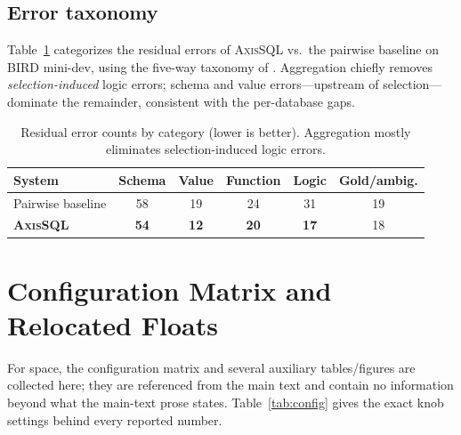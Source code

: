\documentclass{article}
\newcommand{\sys}{\textsc{AxisSQL}\xspace}
\begin{document}
\subsection{Error taxonomy}
\label{app:error}
Table~\ref{tab:s-error} categorizes the residual errors of \sys{} vs.\ the pairwise baseline on BIRD mini-dev, using the five-way taxonomy of \citet{li2026deepeye}. Aggregation chiefly removes \emph{selection-induced} logic errors; schema and value errors---upstream of selection---dominate the remainder, consistent with the per-database gaps.

\begin{table}[h]
\centering\small
\caption{Residual error counts by category (lower is better). Aggregation mostly eliminates selection-induced logic errors.}
\label{tab:s-error}
\begin{tabular}{@{}lccccc@{}}
\toprule
\textbf{System} & \textbf{Schema} & \textbf{Value} & \textbf{Function} & \textbf{Logic} & \textbf{Gold/ambig.} \\
\midrule
Pairwise baseline & 58 & 19 & 24 & 31 & 19 \\
\textbf{\sys}     & \textbf{54} & \textbf{12} & \textbf{20} & \textbf{17} & 18 \\
\bottomrule
\end{tabular}
\end{table}

\section{Configuration Matrix and Relocated Floats}
\label{app:floats}
For space, the configuration matrix and several auxiliary tables/figures are collected here; they are referenced from the main text and contain no information beyond what the main-text prose states. Table~\ref{tab:config} gives the exact knob settings behind every reported number.
\end{document}

